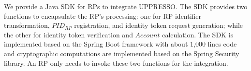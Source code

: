 


We provide a Java SDK for RPs to integrate UPPRESSO.
The SDK provides two functions to encapsulate the RP's processing: one for RP identifier transformation, $PID_{RP}$ registration, and identity token request generation; while the other for identity token verification and $Account$ calculation. %
The SDK is implemented based on the Spring Boot framework  with about 1,000 lines code and cryptographic computations are implemented based on the Spring Security library.
An RP only needs to invoke these two functions for the integration.



